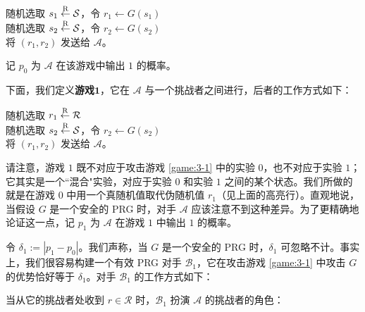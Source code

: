 \vspace*{10pt}

\hspace*{5pt} 随机选取 $s_1\overset{\rm R}\leftarrow\mathcal S$，令 $r_1\leftarrow G(s_1)$\\
\hspace*{26pt} 随机选取 $s_2\overset{\rm R}\leftarrow\mathcal S$，令 $r_2\leftarrow G(s_2)$\\
\hspace*{26pt} 将 $(r_1,r_2)$ 发送给 $\mathcal A$。

\vspace*{10pt}

\noindent
记 $p_0$ 为 $\mathcal A$ 在该游戏中输出 $1$ 的概率。

下面，我们定义\textbf{游戏$\mathbf{1}$}，它在 $\mathcal A$ 与一个挑战者之间进行，后者的工作方式如下：

\vspace*{10pt}

\hspace*{2pt} \colorbox{gray!50}{随机选取 $r_1\overset{\rm R}\leftarrow\mathcal R$}\\
\hspace*{26pt} 随机选取 $s_2\overset{\rm R}\leftarrow\mathcal S$，令 $r_2\leftarrow G(s_2)$\\
\hspace*{26pt} 将 $(r_1,r_2)$ 发送给 $\mathcal A$。

\vspace*{10pt}

\noindent
请注意，游戏 $1$ 既不对应于攻击游戏 \ref{game:3-1} 中的实验 $0$，也不对应于实验 $1$；它其实是一个``混合"实验，对应于实验 $0$ 和实验 $1$ 之间的某个状态。我们所做的就是在游戏 $0$ 中用一个真随机值取代伪随机值 $r_1$（见上面的高亮行）。直观地说，当假设 $G$ 是一个安全的 PRG 时，对手 $\mathcal A$ 应该注意不到这种差异。为了更精确地论证这一点，记 $p_1$ 为 $\mathcal A$ 在游戏 $1$ 中输出 $1$ 的概率。

令 $\delta_1:=|p_1-p_0|$。我们声称，当 $G$ 是一个安全的 PRG 时，$\delta_1$ 可忽略不计。事实上，我们很容易构建一个有效 PRG 对手 $\mathcal B_1$，它在攻击游戏 \ref{game:3-1} 中攻击 $G$ 的优势恰好等于 $\delta_1$。对手 $\mathcal B_1$ 的工作方式如下：

\vspace*{10pt}

\hspace*{5pt} 当从它的挑战者处收到 $r\in\mathcal R$ 时，$\mathcal B_1$ 扮演 $\mathcal A$ 的挑战者的角色：

\vspace*{5pt}

